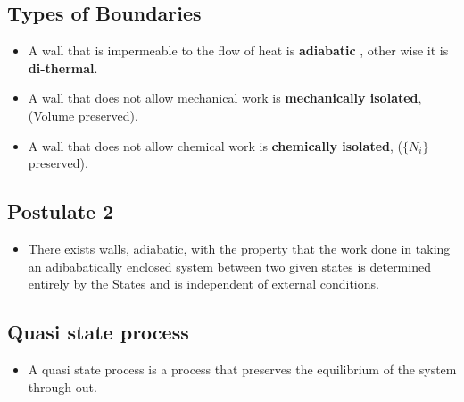 \documentclass[11pt]{article}
\numberwithin{equation}{section}
\numberwithin{equation}{section}
\begin{document}
\subsection{Types of Boundaries}
\begin{itemize}
    \item A wall that is impermeable to the flow of heat is \textbf{adiabatic }, other wise it is \textbf{di-thermal}. 
    \item A wall that does not allow mechanical work is \textbf{mechanically isolated}, (Volume preserved).
    \item A wall that does not allow chemical work is \textbf{chemically isolated}, ($\{N_i\}$ preserved). 

\end{itemize}
\subsection{Postulate 2}
\begin{itemize}
    \item There exists walls, adiabatic, with the property that the work done in taking an adibabatically enclosed system between two given states is determined entirely by the States and is independent of external conditions. 

\end{itemize}
\subsection{Quasi state process}
\begin{itemize}
    \item A quasi state process is a process that preserves the equilibrium of the system through out. 
\end{itemize}
\end{document}
